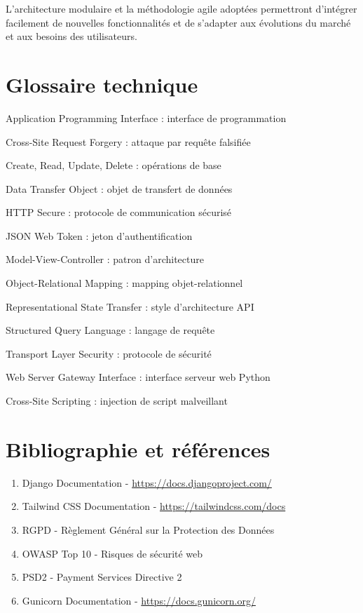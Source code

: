 \documentclass[12pt,a4paper]{report}
\begin{document}
L'architecture modulaire et la méthodologie agile adoptées permettront d'intégrer facilement de nouvelles fonctionnalités et de s'adapter aux évolutions du marché et aux besoins des utilisateurs.

\appendix

\chapter{Glossaire technique}

\begin{description}[style=nextline, leftmargin=4cm]
    \item[API] Application Programming Interface : interface de programmation
    \item[CSRF] Cross-Site Request Forgery : attaque par requête falsifiée
    \item[CRUD] Create, Read, Update, Delete : opérations de base
    \item[DTO] Data Transfer Object : objet de transfert de données
    \item[HTTPS] HTTP Secure : protocole de communication sécurisé
    \item[JWT] JSON Web Token : jeton d'authentification
    \item[MVC] Model-View-Controller : patron d'architecture
    \item[ORM] Object-Relational Mapping : mapping objet-relationnel
    \item[REST] Representational State Transfer : style d'architecture API
    \item[SQL] Structured Query Language : langage de requête
    \item[TLS] Transport Layer Security : protocole de sécurité
    \item[WSGI] Web Server Gateway Interface : interface serveur web Python
    \item[XSS] Cross-Site Scripting : injection de script malveillant
\end{description}

\chapter{Bibliographie et références}

\begin{enumerate}
    \item Django Documentation - \url{https://docs.djangoproject.com/}
    \item Tailwind CSS Documentation - \url{https://tailwindcss.com/docs}
    \item RGPD - Règlement Général sur la Protection des Données
    \item OWASP Top 10 - Risques de sécurité web
    \item PSD2 - Payment Services Directive 2
    \item Gunicorn Documentation - \url{https://docs.gunicorn.org/}
\end{enumerate}
\end{document}

